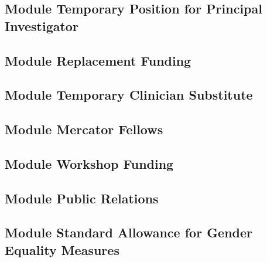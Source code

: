 \documentclass{scrartcl}
\begin{document}
\vspace*{2cm}

\subsection{Module Temporary Position for Principal Investigator}

\subsection{Module Replacement Funding}

\subsection{Module Temporary Clinician Substitute}

\subsection{Module Mercator Fellows}

\subsection{Module Workshop Funding}

\subsection{Module Public Relations}

\subsection{Module Standard Allowance for Gender Equality Measures}
\end{document}
